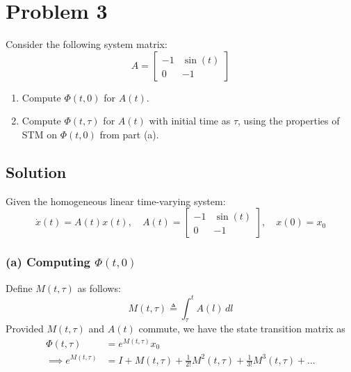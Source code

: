 \section*{Problem 3}
\setcounter{section}{3}

Consider the following system matrix:
\begin{equation*}
    A
    =
    \begin{bmatrix}
        -1 & \sin(t) \\
        0  & -1
    \end{bmatrix}
\end{equation*}
\begin{enumerate}[label= (\alph*)]
    \item Compute \( \Phi(t, 0) \) for \( A(t) \).
    \item Compute \( \Phi(t, \tau) \) for \( A(t) \) with initial time as \( \tau \), using the properties of STM on \( \Phi(t, 0) \) from part (a).
\end{enumerate}

\subsection*{Solution}

Given the homogeneous linear time-varying system:
\begin{equation*}
    \dot{x}(t) = A(t) x(t),
    \quad
    A(t)
    =
    \begin{bmatrix}
        -1 & \sin(t) \\
        0  & -1
    \end{bmatrix},
    \quad
    x(0) = x_0
\end{equation*}

\subsubsection*{(a) Computing \( \Phi(t, 0) \)}

Define \( M(t, \tau) \) as follows:
\begin{equation}\label{eq:M(t, tau)}
    M(t, \tau)
    \triangleq
    \int_{\tau}^{t} A(l) \, dl
\end{equation}
Provided \( M(t, \tau) \) and \( A(t) \) commute, we have the state transition matrix as
\begin{align*}
    \Phi(t, \tau)
     & =
    e^{M(t, \tau)} x_0
    \\
    \implies
    e^{M(t, \tau)}
     & =
    I + M(t, \tau) + \frac{1}{2!} M^2(t, \tau) + \frac{1}{3!} M^3(t, \tau) + \ldots
\end{align*}

